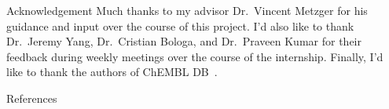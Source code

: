 \documentclass[final]{beamer}
\newlength{\sepwidth}
\newlength{\colwidth}
\newcommand{\separatorcolumn}{\begin{column}{\sepwidth}\end{column}}
\begin{document}
\begin{frame}[t]
\begin{columns}[t]
\begin{column}{\colwidth}
  \begin{block}{Acknowledgement}
  \small{
    Much thanks to my advisor Dr.~Vincent Metzger for his guidance and input over the course of this project. I'd also like to thank Dr.~Jeremy Yang, Dr.~Cristian Bologa, and Dr.~Praveen Kumar for their feedback during weekly meetings over the course of the internship. Finally, I'd like to thank the   authors of ChEMBL DB~\cite{chembl_db_2023}.}
  \end{block}

  \begin{block}{References}
    \tiny{}
  \end{block}

\end{column}

\separatorcolumn
\end{columns}
\end{frame}
\end{document}
